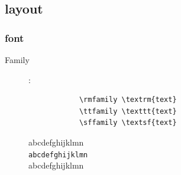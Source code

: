 \documentclass[a4paper,12pt,twoside]{book}
\begin{document}
\begin{CJK*}{UTF8}{song}
	\subsection{layout}
		\subsubsection{font}
			\begin{description}
			\item[Family]:
			\begin{minipage}{0.45\textwidth}
			 \begin{verbatim}
			\rmfamily \textrm{text}
			\ttfamily \texttt{text}
			\sffamily \textsf{text}
			\end{verbatim}
			\end{minipage}
			\begin{minipage}{0.45\textwidth}
			\textrm{abcdefghijklmn} \\
			\texttt{abcdefghijklmn} \\
			\textsf{abcdefghijklmn}
			\end{minipage}
			

\end{description}
\end{CJK*}
\end{document}
